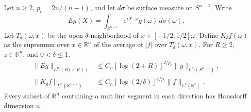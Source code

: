 Let \(n\ge2\), \(p_c=2n/(n-1)\), and let \(d\sigma\) be surface measure on \(S^{n-1}\). Write
\[
 Eg(X)=\int_{S^{n-1}} e^{iX\cdot\omega}g(\omega)\,d\sigma(\omega).
\]
Let \(T_\delta(\omega,x)\) be the open \(\delta\)-neighborhood of \(x+[-1/2,1/2]\omega\). Define \(K_\delta f(\omega)\) as the supremum over \(x\in\mathbb R^n\) of the average of \(|f|\) over \(T_\delta(\omega,x)\). For \(R\ge2\), \(z\in\mathbb R^n\), and \(0<\delta\le1\),
\[
\begin{aligned}
 \|Eg\|_{L^{p_c}(B(z,R))}&\le C_n[\log(2+R)]^{2/p_c}\|g\|_{L^{p_c}(S^{n-1})},\\
 \|K_\delta f\|_{L^n(S^{n-1})}&\le C_n[\log(2/\delta)]^{4/p_c}\|f\|_{L^n(\mathbb R^n)}.
\end{aligned}
\]
Every subset of \(\mathbb R^n\) containing a unit line segment in each direction has Hausdorff dimension \(n\).
